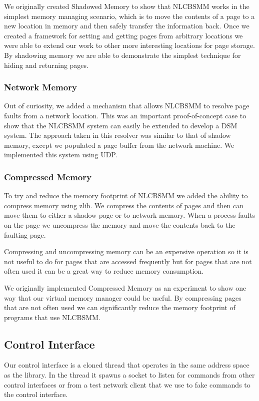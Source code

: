 \documentclass[9pt]{sig-alternate-10pt}
\begin{document}
We originally created Shadowed Memory to show that NLCBSMM works in the simplest memory managing scenario, which is to move the contents of a page to a new location in memory and then safely transfer the information back. Once we created a framework for setting and getting pages from arbitrary locations we were able to extend our work to other more interesting locations for page storage. By shadowing memory we are able to demonstrate the simplest technique for hiding and returning pages. 

\subsubsection{Network Memory} 
Out of curiosity, we added a mechanism that allows NLCBSMM to resolve page faults from a network location.  This was an important proof-of-concept case to show that the NLCBSMM system can easily be extended to develop a DSM system.  The approach taken in this resolver was similar to that of shadow memory, except we populated a page buffer from the network machine.  We implemented this system using UDP. 

\subsubsection{Compressed Memory}
To try and reduce the memory footprint of NLCBSMM we added the ability to compress memory using zlib. We compress the contents of pages and then can move them to either a shadow page or to network memory. When a process faults on the page we uncompress the memory and move the contents back to the faulting page. 

Compressing and uncompressing memory can be an expensive operation so it is not useful to do for pages that are accessed frequently but for pages that are not often used it can be a great way to reduce memory consumption.

We originally implemented Compressed Memory as an experiment to show one way that our virtual memory manager could be useful. By compressing pages that are not often used we can significantly reduce the memory footprint of programs that use NLCBSMM. 

\subsection{Control Interface}
Our control interface is a cloned thread that operates in the same address space as the library. In the thread it spawns a socket to listen for commands from other control interfaces or from a test network client that we use to fake commands to the control interface. 
\end{document}
